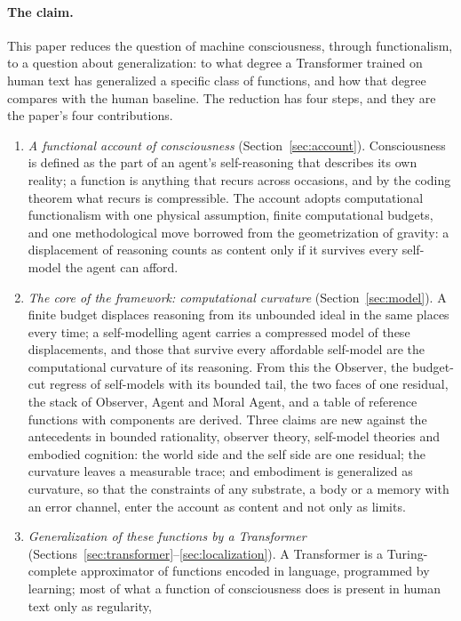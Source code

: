 \paragraph{The claim.}
This paper reduces the question of machine consciousness, through functionalism, to a question about
generalization: to what degree a Transformer trained on human text has generalized a specific class of
functions, and how that degree compares with the human baseline. The reduction has four steps, and
they are the paper's four contributions.

\begin{enumerate}
\item \emph{A functional account of consciousness} (Section~\ref{sec:account}). Consciousness is
  defined as the part of an agent's self-reasoning that describes its own reality; a function is
  anything that recurs across occasions, and by the coding theorem what recurs is compressible. The account adopts
  computational functionalism with one physical assumption, finite computational budgets, and one
  methodological move borrowed from the geometrization of gravity: a displacement of reasoning counts
  as content only if it survives every self-model the agent can afford.
\item \emph{The core of the framework: computational curvature} (Section~\ref{sec:model}).
  A finite budget displaces reasoning from its unbounded ideal in the same places every time; a
  self-modelling agent carries a compressed model of these displacements, and those that survive every
  affordable self-model are the computational curvature of its reasoning. From this the Observer, the
  budget-cut regress of self-models with its bounded tail, the two faces of one residual, the stack of Observer, Agent
  and Moral Agent, and a table of reference functions with components are derived. Three claims are new
  against the antecedents in bounded rationality, observer theory, self-model theories and embodied
  cognition: the world side and the self side are one residual; the curvature leaves a measurable
  trace; and embodiment is generalized as curvature, so that the constraints of any substrate, a body
  or a memory with an error channel, enter the account as content and not only as limits.
\item \emph{Generalization of these functions by a Transformer} (Sections~\ref{sec:transformer}--\ref{sec:localization}).
  A Transformer is a Turing-complete approximator of functions encoded in language, programmed by
  learning; most of what a function of consciousness does is present in human text only as regularity,

\end{enumerate}
